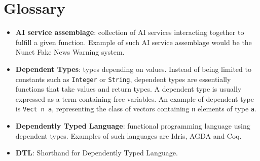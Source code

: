 \documentclass[]{report}
\begin{document}
\chapter{Glossary}
\begin{itemize}
\item \textbf{AI service assemblage}: collection of AI services
  interacting together to fulfill a given function.  Example of such
  AI service assemblage would be the Nunet Fake News Warning system.
\item \textbf{Dependent Types}: types depending on values.  Instead of
  being limited to constants such as \texttt{Integer} or
  \texttt{String}, dependent types are essentially functions that take
  values and return types.  A dependent type is usually expressed as a
  term containing free variables.  An example of dependent type is
  \texttt{Vect n a}, representing the class of vectors containing
  \texttt{n} elements of type \texttt{a}.
\item \textbf{Dependently Typed Language}: functional programming
  language using dependent types.  Examples of such languages are
  Idris, AGDA and Coq.
\item \textbf{DTL}: Shorthand for Dependently Typed Language.
\end{itemize}



\end{document}
